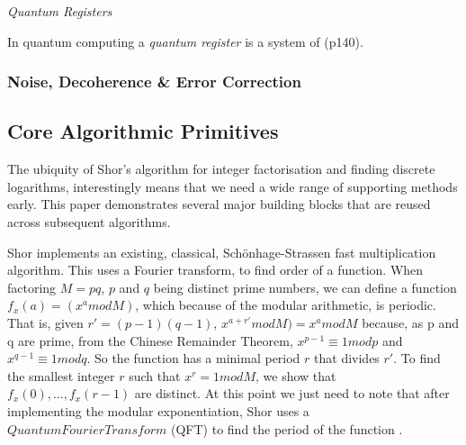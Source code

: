 
\emph{Quantum Registers}

In quantum computing a \emph{quantum register} is a system of  \cite{Lipton:2021} (p140).


\subsubsection{Noise, Decoherence \& Error Correction}









\subsection{Core Algorithmic Primitives}

The ubiquity of Shor's algorithm for integer factorisation and finding discrete logarithms,
interestingly means that we need a wide range of supporting methods early.  
This paper demonstrates several major building blocks that are reused across subsequent algorithms.

Shor implements an existing, classical, Sch\"{o}nhage-Strassen fast multiplication algorithm.
This uses a Fourier transform, to find order of a function.  
When factoring $M = pq$, $p$ and $q$ being distinct prime numbers,
we can define a function $f_x(a) = (x^a mod M)$, which because of the modular arithmetic, is periodic.
That is, given $r' = (p-1)(q-1)$, $x^{a+r'} mod M) = x^a mod M$ because, as p and q are prime, 
from the Chinese Remainder Theorem, $x^{p-1} \equiv 1 mod p$ and  $x^{q-1} \equiv 1 mod q$.
So the function has a minimal period $r$ that divides $r'$.  
To find the smallest integer $r$ such that $x^r = 1 mod M$, 
we show that $f_x(0),..., f_x(r-1)$ are distinct.  
At this point we just need to note that after implementing the modular exponentiation,
Shor uses a $Quantum Fourier Transform$ (QFT) to find the period of the function \cite{Shor:1996}. 

